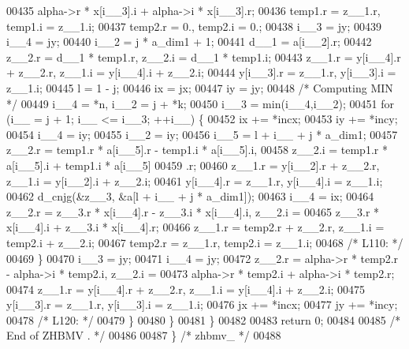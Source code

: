 \begin{DoxyCode}
00435              alpha->r * x[i\_\_3].i + alpha->i * x[i\_\_3].r;
00436         temp1.r = z\_\_1.r, temp1.i = z\_\_1.i;
00437         temp2.r = 0., temp2.i = 0.;
00438         i\_\_3 = jy;
00439         i\_\_4 = jy;
00440         i\_\_2 = j * a\_dim1 + 1;
00441         d\_\_1 = a[i\_\_2].r;
00442         z\_\_2.r = d\_\_1 * temp1.r, z\_\_2.i = d\_\_1 * temp1.i;
00443         z\_\_1.r = y[i\_\_4].r + z\_\_2.r, z\_\_1.i = y[i\_\_4].i + z\_\_2.i;
00444         y[i\_\_3].r = z\_\_1.r, y[i\_\_3].i = z\_\_1.i;
00445         l = 1 - j;
00446         ix = jx;
00447         iy = jy;
00448 \textcolor{comment}{/* Computing MIN */}
00449         i\_\_4 = *n, i\_\_2 = j + *k;
00450         i\_\_3 = min(i\_\_4,i\_\_2);
00451         \textcolor{keywordflow}{for} (i\_\_ = j + 1; i\_\_ <= i\_\_3; ++i\_\_) \{
00452             ix += *incx;
00453             iy += *incy;
00454             i\_\_4 = iy;
00455             i\_\_2 = iy;
00456             i\_\_5 = l + i\_\_ + j * a\_dim1;
00457             z\_\_2.r = temp1.r * a[i\_\_5].r - temp1.i * a[i\_\_5].i, 
00458                 z\_\_2.i = temp1.r * a[i\_\_5].i + temp1.i * a[i\_\_5]
00459                 .r;
00460             z\_\_1.r = y[i\_\_2].r + z\_\_2.r, z\_\_1.i = y[i\_\_2].i + z\_\_2.i;
00461             y[i\_\_4].r = z\_\_1.r, y[i\_\_4].i = z\_\_1.i;
00462             d\_cnjg(&z\_\_3, &a[l + i\_\_ + j * a\_dim1]);
00463             i\_\_4 = ix;
00464             z\_\_2.r = z\_\_3.r * x[i\_\_4].r - z\_\_3.i * x[i\_\_4].i, z\_\_2.i =
00465                  z\_\_3.r * x[i\_\_4].i + z\_\_3.i * x[i\_\_4].r;
00466             z\_\_1.r = temp2.r + z\_\_2.r, z\_\_1.i = temp2.i + z\_\_2.i;
00467             temp2.r = z\_\_1.r, temp2.i = z\_\_1.i;
00468 \textcolor{comment}{/* L110: */}
00469         \}
00470         i\_\_3 = jy;
00471         i\_\_4 = jy;
00472         z\_\_2.r = alpha->r * temp2.r - alpha->i * temp2.i, z\_\_2.i = 
00473             alpha->r * temp2.i + alpha->i * temp2.r;
00474         z\_\_1.r = y[i\_\_4].r + z\_\_2.r, z\_\_1.i = y[i\_\_4].i + z\_\_2.i;
00475         y[i\_\_3].r = z\_\_1.r, y[i\_\_3].i = z\_\_1.i;
00476         jx += *incx;
00477         jy += *incy;
00478 \textcolor{comment}{/* L120: */}
00479         \}
00480     \}
00481     \}
00482 
00483     \textcolor{keywordflow}{return} 0;
00484 
00485 \textcolor{comment}{/*     End of ZHBMV . */}
00486 
00487 \} \textcolor{comment}{/* zhbmv\_ */}
00488 
\end{DoxyCode}
